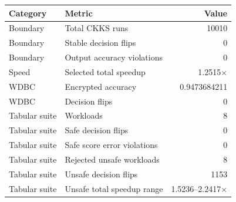 \begin{tabular}{llr}
\toprule
Category & Metric & Value \\
\midrule
Boundary & Total CKKS runs & 10010 \\
Boundary & Stable decision flips & 0 \\
Boundary & Output accuracy violations & 0 \\
Speed & Selected total speedup & 1.2515$\times$ \\
WDBC & Encrypted accuracy & 0.9473684211 \\
WDBC & Decision flips & 0 \\
Tabular suite & Workloads & 8 \\
Tabular suite & Safe decision flips & 0 \\
Tabular suite & Safe score error violations & 0 \\
Tabular suite & Rejected unsafe workloads & 8 \\
Tabular suite & Unsafe decision flips & 1153 \\
Tabular suite & Unsafe total speedup range & 1.5236--2.2417$\times$ \\
\bottomrule
\end{tabular}
